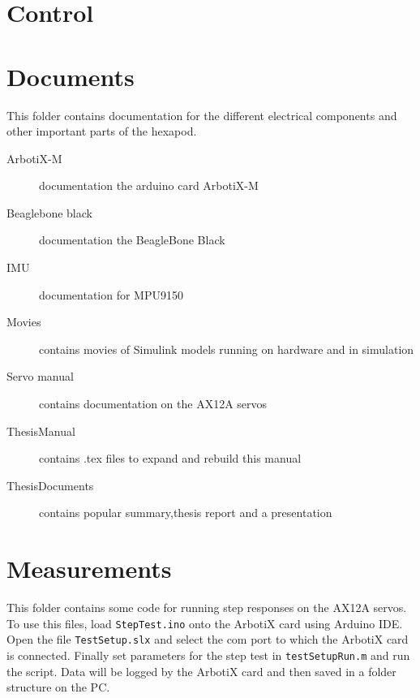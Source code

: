 \documentclass[letterpaper, 10 pt]{report}
\begin{document}
\section{Control}
\label{sec:control}


\section{Documents}
This folder contains documentation for the different electrical components and other important parts of the hexapod.
\begin{description}
  \item[ArbotiX-M] documentation the arduino card ArbotiX-M 
  \item[Beaglebone black] documentation the BeagleBone Black
  \item[IMU] documentation for MPU9150
  \item[Movies] contains movies of Simulink models running on hardware and in simulation
  \item[Servo manual]  contains documentation on the AX12A servos
  \item[ThesisManual] contains .tex files to expand and rebuild this manual
  \item[ThesisDocuments] contains popular summary,thesis report and a presentation 
\end{description}

\section{Measurements}
This folder contains some code for running step responses on the AX12A servos. 
To use this files, load \texttt{StepTest.ino} onto the ArbotiX card using Arduino IDE.
Open the file \texttt{TestSetup.slx} and select the com port to which the ArbotiX card is connected. 
Finally set parameters for the step test in \texttt{testSetupRun.m} and run the script.
Data will be logged by the ArbotiX card and then saved in a folder structure on the PC.

\end{document}
